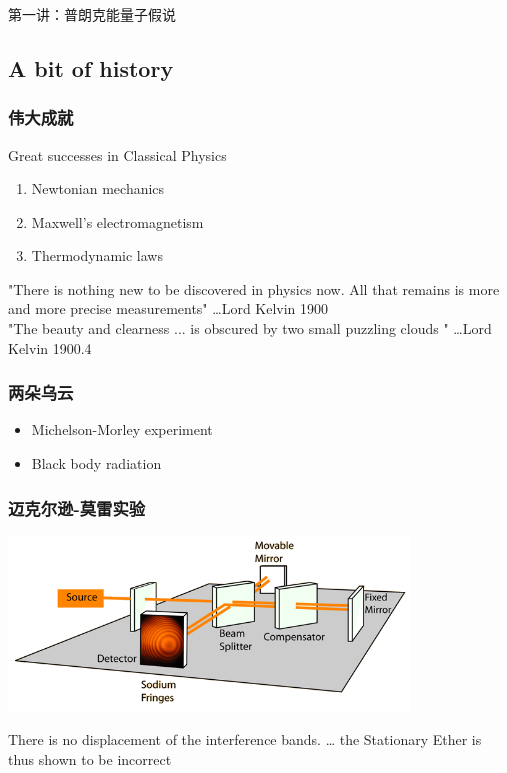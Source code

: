 \begin{frame}
    \frametitle{}
    \begin{center}
    { {\huge 第一讲：普朗克能量子假说 }}
    \end{center}    
\end{frame}

\subsection{A bit of history}

\begin{frame}
    \frametitle{伟大成就}
    Great successes in Classical Physics\\
        \begin{enumerate}
            \item Newtonian mechanics
            \item Maxwell's electromagnetism
            \item Thermodynamic laws
        \end{enumerate}
        "There is nothing new to be discovered in physics now. All that remains is 
        more and more precise measurements"   \ldots Lord Kelvin 1900 \\
        "The beauty and clearness ... is 
        obscured by two small puzzling clouds "  \ldots Lord Kelvin 1900.4
\end{frame}

\begin{frame}
    \frametitle{两朵乌云}
        \begin{itemize} 
            \item Michelson-Morley experiment
            \item Black body radiation
        \end{itemize}
\end{frame}

\begin{frame}
    \frametitle{迈克尔逊-莫雷实验}
    \begin{center}
    \includegraphics[width=0.8\textwidth]{figs/michel.png}
    \end{center}
There is no displacement of the interference bands. \dots 
the Stationary Ether is thus shown to be incorrect
\end{frame}

